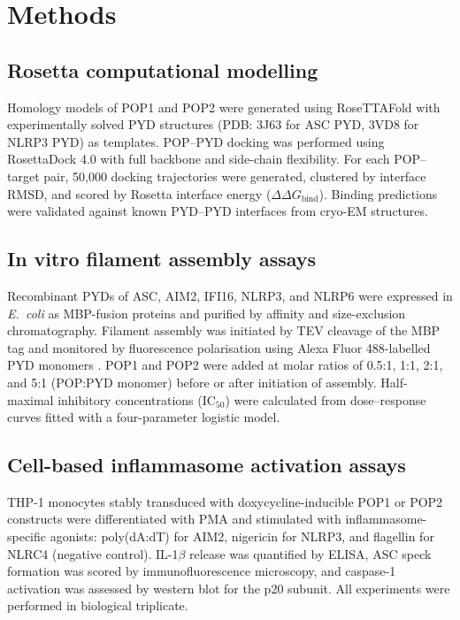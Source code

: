 \documentclass[12pt]{article}
\begin{document}
\section{Methods}

\subsection{Rosetta computational modelling}

Homology models of POP1 and POP2 were generated using RoseTTAFold \citep{baek2021accurate} with experimentally solved PYD structures (PDB: 3J63 for ASC PYD, 3VD8 for NLRP3 PYD) as templates. POP--PYD docking was performed using RosettaDock 4.0 \citep{gray2003protein} with full backbone and side-chain flexibility. For each POP--target pair, 50{,}000 docking trajectories were generated, clustered by interface RMSD, and scored by Rosetta interface energy ($\Delta\Delta G_{\text{bind}}$). Binding predictions were validated against known PYD--PYD interfaces from cryo-EM structures.

\subsection{In vitro filament assembly assays}

Recombinant PYDs of ASC, AIM2, IFI16, NLRP3, and NLRP6 were expressed in \textit{E.\ coli} as MBP-fusion proteins and purified by affinity and size-exclusion chromatography. Filament assembly was initiated by TEV cleavage of the MBP tag and monitored by fluorescence polarisation using Alexa Fluor 488-labelled PYD monomers \citep{lu2014unified}. POP1 and POP2 were added at molar ratios of 0.5:1, 1:1, 2:1, and 5:1 (POP:PYD monomer) before or after initiation of assembly. Half-maximal inhibitory concentrations (IC$_{50}$) were calculated from dose--response curves fitted with a four-parameter logistic model.

\subsection{Cell-based inflammasome activation assays}

THP-1 monocytes stably transduced with doxycycline-inducible POP1 or POP2 constructs were differentiated with PMA and stimulated with inflammasome-specific agonists: poly(dA:dT) for AIM2, nigericin for NLRP3, and flagellin for NLRC4 (negative control). IL-1$\beta$ release was quantified by ELISA, ASC speck formation was scored by immunofluorescence microscopy, and caspase-1 activation was assessed by western blot for the p20 subunit. All experiments were performed in biological triplicate.
\end{document}

